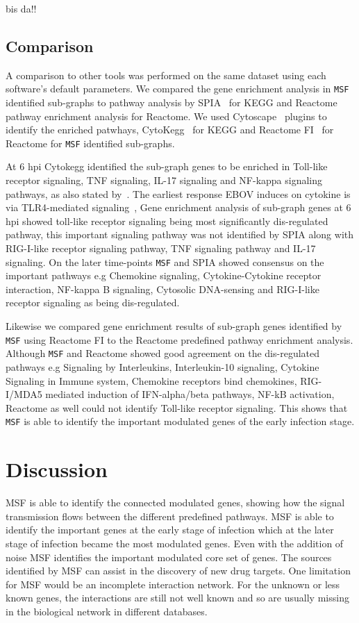 \documentclass[10pt,a4paper,twocolumn]{article}
\newcommand{\TODO}[1]{\begingroup\color{red}#1\endgroup}
\begin{document}
\TODO{bis da!!}

\subsection*{Comparison}

 A comparison to other tools was performed on the same dataset using each
 software's default parameters. We compared the gene enrichment analysis in
 \texttt{MSF} identified sub-graphs to pathway analysis by
 SPIA~\cite{Tarca} for KEGG and Reactome pathway enrichment analysis for
 Reactome.  We used Cytoscape~\cite{Cyto} plugins to identify the enriched
 patwhays, CytoKegg~\cite{Cytokegg} for KEGG and Reactome
 FI~\cite{Reactome} for Reactome for \texttt{MSF} identified sub-graphs.

At 6 hpi Cytokegg identified the sub-graph genes to be enriched in
Toll-like receptor signaling, TNF signaling, IL-17 signaling and NF-kappa
signaling pathways, as also stated by~\cite{Olejnik}. The earliest response
EBOV induces on cytokine is via TLR4-mediated signaling~\cite{Olejnik},
Gene enrichment analysis of sub-graph genes at 6 hpi showed toll-like
receptor signaling being most significantly dis-regulated pathway, this
important signaling pathway was not identified by SPIA along with
RIG-I-like receptor signaling pathway, TNF signaling pathway and IL-17
signaling. On the later time-points \texttt{MSF} and SPIA showed consensus
on the important pathways e.g Chemokine signaling, Cytokine-Cytokine
receptor interaction, NF-kappa B signaling, Cytosolic DNA-sensing and
RIG-I-like receptor signaling as being dis-regulated.

Likewise we compared gene enrichment results of sub-graph genes identified
by \texttt{MSF} using Reactome FI to the Reactome predefined pathway
enrichment analysis. Although \texttt{MSF} and Reactome showed good
agreement on the dis-regulated pathways e.g Signaling by Interleukins,
Interleukin-10 signaling, Cytokine Signaling in Immune system, Chemokine
receptors bind chemokines, RIG-I/MDA5 mediated induction of IFN-alpha/beta
pathways, NF-kB activation, Reactome as well could not identify Toll-like
receptor signaling. This shows that \texttt{MSF} is able to identify the
important modulated genes of the early infection stage.


\section*{Discussion}

MSF is able to identify the connected modulated genes, showing how the
signal transmission flows between the different predefined pathways. MSF is
able to identify the important genes at the early stage of infection which
at the later stage of infection became the most modulated genes. Even with
the addition of noise MSF identifies the important modulated core set of
genes. The sources identified by MSF can assist in the discovery of new
drug targets. One limitation for MSF would be an incomplete interaction
network. For the unknown or less known genes, the interactions are still
not well known and so are usually missing in the biological network in
different databases.
\end{document}
